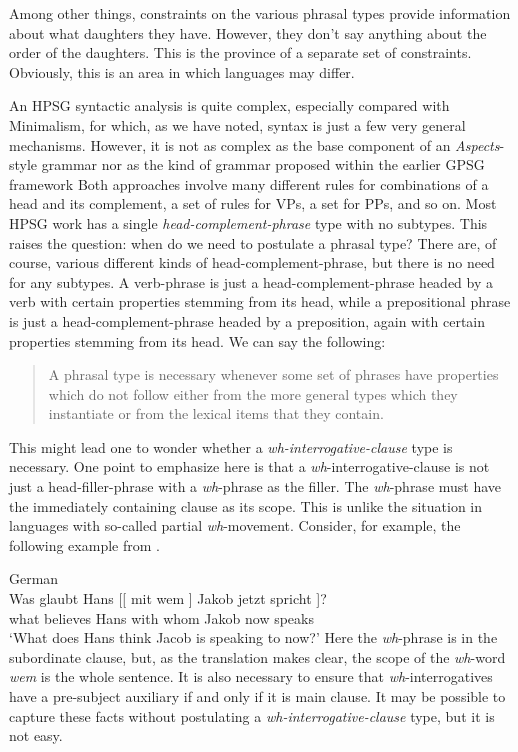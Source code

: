 \documentclass[output=paper]{langsci/langscibook}
\begin{document}
Among other things, constraints on the various phrasal types provide
information about what daughters they have. However, they don’t say anything
about the order of the daughters. This is the province of a separate set of
constraints. Obviously, this is an area in which languages may differ.

An \gls{HPSG} syntactic analysis is quite complex, especially compared with
Minimalism, for which, as we have noted, syntax is just a few very general
mechanisms. However, it is not as complex as the base component of an
\emph{Aspects}-style grammar \citep{Chomsky1965} nor as the kind of grammar
proposed within the earlier \gls{GPSG} framework \parencite{GazKlePulSag1985}
Both approaches involve many different rules for combinations of a head and its
complement, a set of rules for VPs, a set for PPs, and so on. Most \gls{HPSG}
work has a single \emph{head-complement-phrase} type with no subtypes. This
raises the question: when do we need to postulate a phrasal type? There are, of
course, various different kinds of head-complement-phrase, but there is no need
for any subtypes. A verb-phrase is just a head-complement-phrase headed by a
verb with certain properties stemming from its head, while a prepositional
phrase is just a head-complement-phrase headed by a preposition, again with
certain properties stemming from its head. We can say the following:

\begin{quote}

A phrasal type is necessary whenever some set of phrases have properties which
do not follow either from the more general types which they instantiate or from
the lexical items that they contain.

\end{quote}
%
This might lead one to wonder whether a \emph{wh-interrogative-clause} type is
necessary. One point to emphasize here is that a
\emph{wh}-interrogative-clause is not just a head-filler-phrase with a
\emph{wh}-phrase as the filler. The \emph{wh}-phrase must have the
immediately containing clause as its scope. This is unlike the situation in
languages with so-called partial \emph{wh}-movement. Consider, for example,
the following  example from \citet{McDaniel1989}.

\ea\label{ex:borsley:4.6} German\\
    \gll    Was glaubt Hans [[ mit wem ] Jakob jetzt spricht ]?\\
            what believes Hans {} with whom {} Jakob now speaks {}\\
    \glt    \enquote*{What does Hans think Jacob is speaking to now?}
\z
%
Here the \emph{wh}-phrase is in the subordinate clause, but, as the
translation makes clear, the scope of the \emph{wh}-word \emph{wem} is
the whole sentence. It is also necessary to ensure that 
\emph{wh}-interrogatives have a pre-subject auxiliary if and only if it is
main clause. It may be possible to capture these facts without postulating a
\emph{wh-interrogative-clause} type, but it is not easy.
\end{document}
